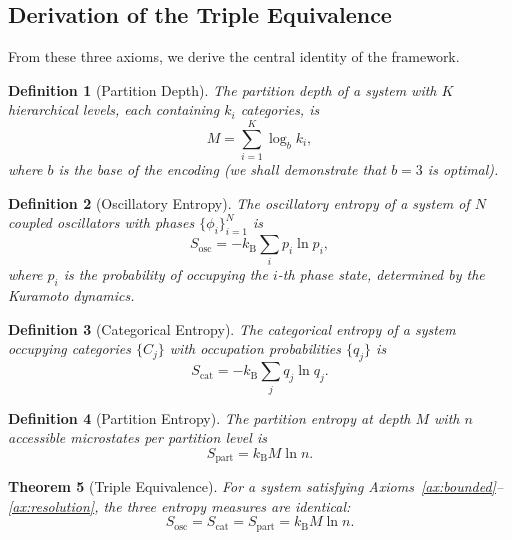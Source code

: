 \documentclass[twocolumn,10pt]{article}
\newtheorem{theorem}{Theorem}[section]
\newtheorem{definition}[theorem]{Definition}
\newcommand{\Sosc}{S_{\mathrm{osc}}}
\newcommand{\Scat}{S_{\mathrm{cat}}}
\newcommand{\Spart}{S_{\mathrm{part}}}
\newcommand{\kB}{k_{\mathrm{B}}}
\begin{document}
\subsection{Derivation of the Triple Equivalence}

From these three axioms, we derive the central identity of the framework.

\begin{definition}[Partition Depth]
\label{def:partition_depth}
The \emph{partition depth} of a system with $K$ hierarchical levels, each containing $k_{i}$ categories, is
\begin{equation}
  M = \sum_{i=1}^{K} \log_{b} k_{i},
  \label{eq:partition_depth}
\end{equation}
where $b$ is the base of the encoding (we shall demonstrate that $b = 3$ is optimal).
\end{definition}

\begin{definition}[Oscillatory Entropy]
The oscillatory entropy of a system of $N$ coupled oscillators with phases $\{\phi_{i}\}_{i=1}^{N}$ is
\begin{equation}
  \Sosc = -\kB \sum_{i} p_{i} \ln p_{i},
  \label{eq:sosc}
\end{equation}
where $p_{i}$ is the probability of occupying the $i$-th phase state, determined by the Kuramoto dynamics.
\end{definition}

\begin{definition}[Categorical Entropy]
The categorical entropy of a system occupying categories $\{C_{j}\}$ with occupation probabilities $\{q_{j}\}$ is
\begin{equation}
  \Scat = -\kB \sum_{j} q_{j} \ln q_{j}.
  \label{eq:scat}
\end{equation}
\end{definition}

\begin{definition}[Partition Entropy]
The partition entropy at depth $M$ with $n$ accessible microstates per partition level is
\begin{equation}
  \Spart = \kB M \ln n.
  \label{eq:spart}
\end{equation}
\end{definition}

\begin{theorem}[Triple Equivalence]
\label{thm:triple}
For a system satisfying Axioms~\ref{ax:bounded}--\ref{ax:resolution}, the three entropy measures are identical:
\begin{equation}
  \Sosc = \Scat = \Spart = \kB M \ln n.
  \label{eq:triple_thm}
\end{equation}
\end{theorem}
\end{document}
